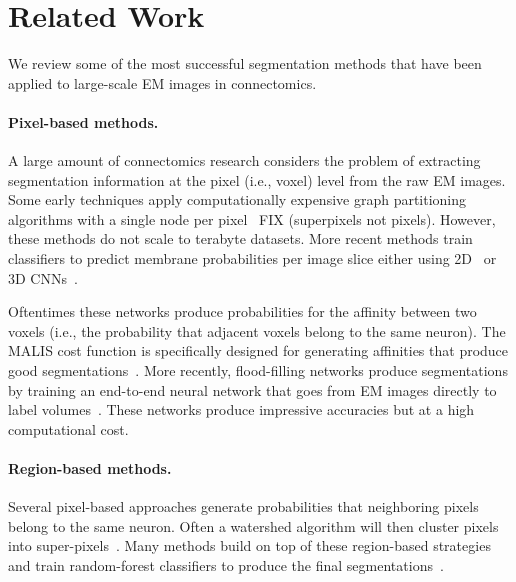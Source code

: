 
\section{Related Work}

We review some of the most successful segmentation methods that have been applied to large-scale EM images in connectomics.

\paragraph{Pixel-based methods.}
A large amount of connectomics research considers the problem of extracting segmentation information at the pixel (i.e., voxel) level from the raw EM images. Some early techniques apply computationally expensive graph partitioning algorithms with a single node per pixel~\cite{andres2012globally} FIX (superpixels not pixels). However, these methods do not scale to terabyte datasets. More recent methods train classifiers to predict membrane probabilities per image slice either using 2D~\cite{ciresan2012deep,jain2010boundary,kaynig2015large,seymour2016rhoananet,amelio_segmentation,ronneberger2015u} or 3D CNNs~\cite{lee2015recursive,cciccek20163d,turaga2010convolutional}.

Oftentimes these networks produce probabilities for the affinity between two voxels (i.e., the probability that adjacent voxels belong to the same neuron). The MALIS cost function is specifically designed for generating affinities that produce good segmentations~\cite{briggman2009maximin}. More recently, flood-filling networks produce segmentations by training an end-to-end neural network that goes from EM images directly to label volumes~\cite{januszewski2016flood}. These networks produce impressive accuracies but at a high computational cost.

\paragraph{Region-based methods.}
Several pixel-based approaches generate probabilities that neighboring pixels belong to the same neuron.
Often a watershed algorithm will then cluster pixels into super-pixels~\cite{zlateski2015image}.
Many methods build on top of these region-based strategies and train random-forest classifiers to produce the final segmentations~\cite{seymour2016rhoananet,nunez2014graph,10.1371/journal.pone.0125825,parag2017anisotropic,zlateski2015image}.

